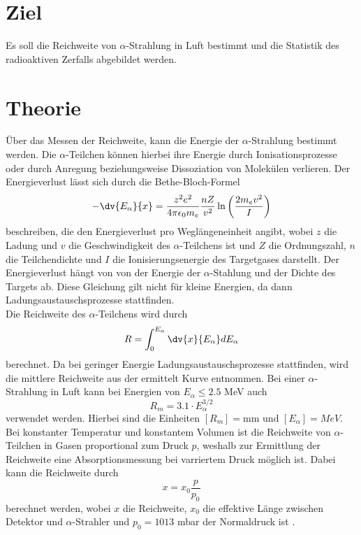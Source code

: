 \section{Ziel}
Es soll die Reichweite von $\alpha$-Strahlung in Luft bestimmt und die Statistik des radioaktiven Zerfalls abgebildet werden. 

\section{Theorie}
Über das Messen der Reichweite, kann die Energie der $\alpha$-Strahlung bestimmt werden. Die $\alpha$-Teilchen können hierbei ihre Energie durch Ionisationsprozesse oder durch Anregung beziehungsweise Dissoziation von Molekülen verlieren. Der Energieverlust lässt sich durch die Bethe-Bloch-Formel
\begin{equation}
  -\dv{E_{\alpha}}{x}=\frac{z^2 e^2}{4\pi\epsilon_0 m_e}\frac{nZ}{v^2}\ln{\left(\frac{2m_e v^2}{I}\right)}
  \label{eq:1}
\end{equation}
beschreiben, die den Energieverlust pro Weglängeneinheit angibt, wobei $z$ die Ladung und $v$ die Geschwindigkeit des $\alpha$-Teilchens ist und $Z$ die Ordnungszahl, $n$ die Teilchendichte und $I$ die Ionisierungsenergie des Targetgases darstellt. Der Energieverlust hängt von von der Energie der $\alpha$-Stahlung und der Dichte des Targets ab. Diese Gleichung gilt nicht für kleine Energien, da dann Ladungsaustauschsprozesse stattfinden.\\
Die Reichweite des $\alpha$-Teilchens wird durch
\begin{equation}
  R=\int_{0}^{E_{\alpha}} \dv{x}{E_{\alpha}} dE_{\alpha}
  \label{eq:2}
\end{equation}
berechnet. Da bei geringer Energie Ladungsaustauschsprozesse stattfinden, wird die mittlere Reichweite aus der ermittelt Kurve entnommen. Bei einer $\alpha$-Strahlung in Luft kann bei Energien von $E_\alpha \leq 2.5$ MeV auch 
\begin{equation}
  R_m=3.1\cdot E_\alpha^{3/2}
  \label{eq:3}
\end{equation}
verwendet werden. Hierbei sind die Einheiten $[R_m]=\textrm{mm}$ und $[E_\alpha]=MeV$.\\
Bei konstanter Temperatur und konstantem Volumen ist die Reichweite von $\alpha$-Teilchen in Gasen proportional zum Druck $p$, weshalb zur Ermittlung der Reichweite eine Absorptionsmessung bei varriertem Druck möglich ist. Dabei kann die Reichweite durch
\begin{equation}
  x=x_0 \frac{p}{p_0}
  \label{eq:4}
\end{equation}
berechnet werden, wobei $x$ die Reichweite, $x_0$ die effektive Länge zwischen Detektor und $\alpha$-Strahler und $p_0=1013$ mbar der Normaldruck ist \cite{1}.
